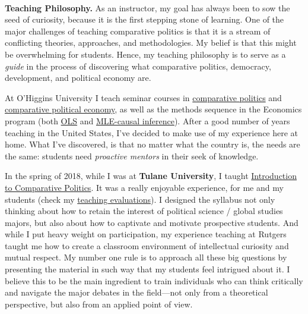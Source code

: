 \vspace{-2cm}{\bf \huge Teaching Statement}\\

{\bf Teaching Philosophy.} As an instructor, my goal has always been to sow the seed of curiosity, because it is the first stepping stone of learning. One of the major challenges of teaching comparative politics is that it is a stream of conflicting theories, approaches, and methodologies. My belief is that this might be overwhelming for students. Hence, my teaching philosophy is to serve as a \emph{guide} in the process of discovering what comparative politics, democracy, development, and political economy are.

At O'Higgins University I teach seminar courses in \href{https://github.com/hbahamonde/Ciencia_Politica_I/raw/master/Bahamonde_Ciencia_Politica_I.pdf}{comparative politics} and \href{https://github.com/hbahamonde/Ciencia_Politica_II/raw/master/Bahamonde_Ciencia_Politica_II.pdf}{comparative political economy}, as well as the methods sequence in the Economics program (both \href{https://github.com/hbahamonde/OLS/raw/master/Bahamonde_OLS.pdf}{OLS} and \href{https://github.com/hbahamonde/MLE/raw/master/Bahamonde_MLE.pdf}{MLE-causal inference}). After a good number of years teaching in the United States, I've decided to make use of my experience here at home. What I've discovered, is that no matter what the country is, the needs are the same: students need \emph{proactive mentors} in their seek of knowledge. 

In the spring of 2018, while I was at {\bf Tulane University}, I taught \href{https://github.com/hbahamonde/Comparative_Politics_UGRAD/raw/master/Bahamonde_Comparative_Politics_Syllabus_UGRAD.pdf}{Introduction to Comparative Politics}. It was a really enjoyable experience, for me and my students (check my \href{https://github.com/hbahamonde/Job_Market/raw/master/Bahamonde_Teaching_Portafolio.pdf}{teaching evaluations}). I designed the syllabus not only thinking about how to retain the interest of political science / global studies majors, but also about how to captivate and motivate prospective students. And while I put heavy weight on participation, my experience teaching at Rutgers taught me how to create a classroom environment of intellectual curiosity and mutual respect. My number one rule is to approach all these big questions by presenting the material in such way that my students feel intrigued about it. I believe this to be the main ingredient to train individuals who can think critically and navigate the major debates in the field---not only from a theoretical perspective, but also from an applied point of view.

